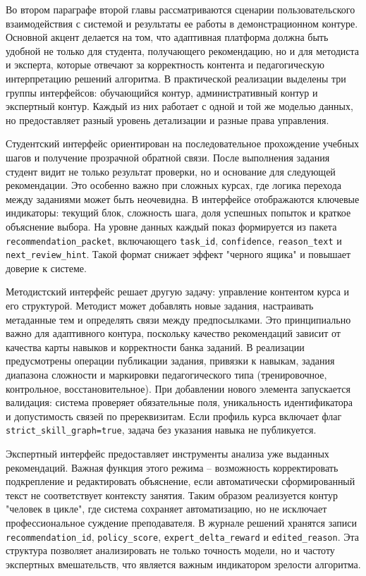 Во втором параграфе второй главы рассматриваются сценарии пользовательского
взаимодействия с системой и результаты ее работы в демонстрационном контуре.
Основной акцент делается на том, что адаптивная платформа должна быть удобной
не только для студента, получающего рекомендацию, но и для методиста и
эксперта, которые отвечают за корректность контента и педагогическую
интерпретацию решений алгоритма. В практической реализации выделены три группы
интерфейсов: обучающийся контур, административный контур и экспертный контур.
Каждый из них работает с одной и той же моделью данных, но предоставляет разный
уровень детализации и разные права управления.

Студентский интерфейс ориентирован на последовательное прохождение учебных
шагов и получение прозрачной обратной связи. После выполнения задания студент
видит не только результат проверки, но и основание для следующей рекомендации.
Это особенно важно при сложных курсах, где логика перехода между заданиями
может быть неочевидна. В интерфейсе отображаются ключевые индикаторы: текущий
блок, сложность шага, доля успешных попыток и краткое объяснение выбора. На
уровне данных каждый показ формируется из пакета
\texttt{recommendation\_packet}, включающего \texttt{task\_id},
\texttt{confidence}, \texttt{reason\_text} и \texttt{next\_review\_hint}. Такой
формат снижает эффект "черного ящика" и повышает доверие к системе.

Методистский интерфейс решает другую задачу: управление контентом курса и его
структурой. Методист может добавлять новые задания, настраивать метаданные тем
и определять связи между предпосылками. Это принципиально важно для адаптивного
контура, поскольку качество рекомендаций зависит от качества карты навыков и
корректности банка заданий. В реализации предусмотрены операции публикации
задания, привязки к навыкам, задания диапазона сложности и маркировки
педагогического типа (тренировочное, контрольное, восстановительное). При
добавлении нового элемента запускается валидация: система проверяет
обязательные поля, уникальность идентификатора и допустимость связей по
пререквизитам. Если профиль курса включает флаг
\texttt{strict\_skill\_graph=true}, задача без указания навыка не публикуется.

Экспертный интерфейс предоставляет инструменты анализа уже выданных
рекомендаций. Важная функция этого режима -- возможность корректировать
подкрепление и редактировать объяснение, если автоматически сформированный
текст не соответствует контексту занятия. Таким образом реализуется контур
"человек в цикле", где система сохраняет автоматизацию, но не исключает
профессиональное суждение преподавателя. В журнале решений хранятся записи
\texttt{recommendation\_id}, \texttt{policy\_score},
\texttt{expert\_delta\_reward} и \texttt{edited\_reason}. Эта структура
позволяет анализировать не только точность модели, но и частоту экспертных
вмешательств, что является важным индикатором зрелости алгоритма.

